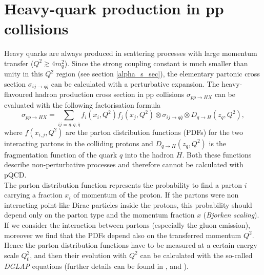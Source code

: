 \documentclass[b5paper,10pt,twoside,oldstyle,classica]{toptesi}
\begin{document}
\section{Heavy-quark production in pp collisions}
\label{HF_prod_sec}
Heavy quarks are always produced in scattering processes with large momentum transfer ($Q^2 \gtrsim 4m_{q}^2$). Since the strong coupling constant is much smaller than unity in this $Q^2$ region (see section \ref{alpha_s_sec}), the elementary partonic cross section $\sigma_{ij\rightarrow q\overline{q}}$ can be calculated with a perturbative expansion. The heavy-flavoured hadron production cross section in pp collisions $\sigma_{pp\rightarrow HX}$ can be evaluated with the following factorisation formula
\begin{equation}
 \sigma_{pp\rightarrow HX} = \sum_{ij=g,q,\overline{q}} f_i(x_i,Q^2)f_j(x_j,Q^2)\otimes\sigma_{ij\rightarrow q\overline{q}}\otimes D_{q\rightarrow H}(z_q,Q^2), 
 \label{HF_prod_eq}
\end{equation}
where $f(x_{i,j},Q^2)$ are the parton distribution functions (PDFs) for the two interacting partons in the colliding protons and $D_{q\rightarrow H}(z_q,Q^2)$ is the fragmentation function of the quark $q$ into the hadron $H$. Both these functions describe non-perturbative processes and therefore cannot be calculated with pQCD. \\The parton distribution function represents the probability to find a parton $i$ carrying a fraction $x_i$ of momentum of the proton. If the partons were non interacting point-like Dirac particles inside the protons, this probability should depend only on the parton type and the momentum fraction $x$ (\textit{Bjorken scaling}). If we consider the interaction between partons (especially the gluon emission), moreover we find that the PDFs depend also on the transferred momentum $Q^2$. Hence the parton distribution functions have to be measured at a certain energy scale $Q_0^2$, and then their evolution with $Q^2$ can be calculated with the so-called \textit{DGLAP} equations (further details can be found in \cite{Gribov:1972ri}, \cite{Altarelli:1977zs} and 
\cite{Dokshitzer:1977sg}).
\end{document}
